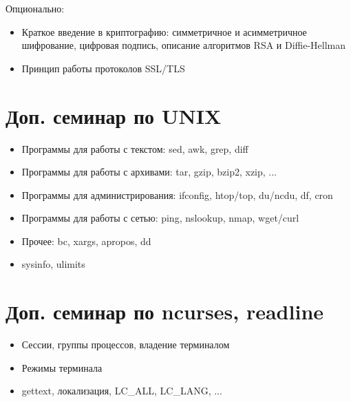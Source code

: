 \documentclass{article}
\begin{document}
    Опционально:
    \begin{itemize}
        \item Краткое введение в криптографию: симметричное и асимметричное шифрование, цифровая подпись, описание алгоритмов RSA и Diffie-Hellman
        \item Принцип работы протоколов SSL/TLS
    \end{itemize}

\section{Доп. семинар по UNIX}

    \begin{itemize}
        \item Программы для работы с текстом: sed, awk, grep, diff
        \item Программы для работы с архивами: tar, gzip, bzip2, xzip, ...
        \item Программы для администрирования: ifconfig, htop/top, du/ncdu, df, cron
        \item Программы для работы с сетью: ping, nslookup, nmap, wget/curl
        \item Прочее: bc, xargs, apropos, dd
        \item sysinfo, ulimits
    \end{itemize}

\section{Доп. семинар по ncurses, readline}

    \begin{itemize}
        \item Сессии, группы процессов, владение терминалом
        \item Режимы терминала
        \item gettext, локализация, LC\_ALL, LC\_LANG, ...
    \end{itemize}
\end{document}
